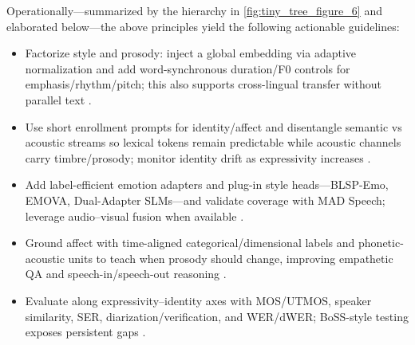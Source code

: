 \documentclass{article}
\begin{document}
Operationally---summarized by the hierarchy in \autoref{fig:tiny_tree_figure_6} and elaborated below---the above principles yield the following actionable guidelines:
\begin{itemize}
\item Factorize style and prosody: inject a global embedding via adaptive normalization and add word-synchronous duration/F0 controls for emphasis/rhythm/pitch; this also supports cross-lingual transfer without parallel text \cite{huang2023holisticcascadesystembenchmarkhumanevalu}.
\item Use short enrollment prompts for identity/affect and disentangle semantic vs acoustic streams so lexical tokens remain predictable while acoustic channels carry timbre/prosody; monitor identity drift as expressivity increases \cite{wang2024evaluatingtextspeechsynthesislargediscre}.
\item Add label-efficient emotion adapters and plug-in style heads---BLSP-Emo, EMOVA, Dual-Adapter SLMs---and validate coverage with MAD Speech; leverage audio--visual fusion when available \cite{wang2024blspemotowardsempatheticlargespeechlangu,futeral2025madspeechmeasuresacousticdiversity,chen2025emovaempoweringlanguagemodelsseehearspea,wang2025dualinformationspeechlanguagemodelsemoti}.
\item Ground affect with time-aligned categorical/dimensional labels and phonetic-acoustic units to teach when prosody should change, improving empathetic QA and speech-in/speech-out reasoning \cite{wang2025incorporatingcontextualparalinguisticund,har-tuv2025pastphoneticacousticspeechtokenizer,entry2025indicsuperbspeechprocessinguniversalperf}.
\item Evaluate along expressivity--identity axes with MOS/UTMOS, speaker similarity, SER, diarization/verification, and WER/dWER; BoSS-style testing exposes persistent gaps \cite{wang2025bossbeyondsemanticspeech}.
\end{itemize}

\end{document}
